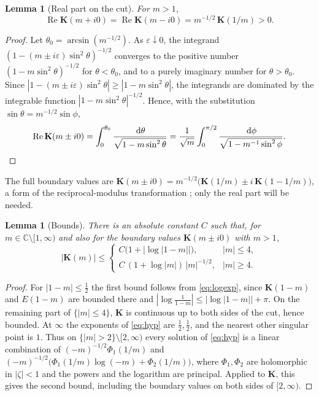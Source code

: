 \documentclass[11pt]{amsart}
\numberwithin{equation}{section}
\newtheorem{lemma}[theorem]{Lemma}
\theoremstyle{definition}
\theoremstyle{remark}
\newcommand{\C}{\mathbb{C}}
\newcommand{\dd}{\,\mathrm{d}}
\DeclareMathOperator{\re}{Re}
\newcommand{\Kc}{\mathbf{K}}
\begin{document}
\begin{lemma}[Real part on the cut]\label{lem:cut}
For $m>1$,
\[
\re\Kc(m+i0)=\re\Kc(m-i0)=m^{-1/2}\,\Kc(1/m)>0 .
\]
\end{lemma}

\begin{proof}
Let $\theta_0=\arcsin(m^{-1/2})$. As $\varepsilon\downarrow0$, the
integrand $(1-(m\pm i\varepsilon)\sin^2\theta)^{-1/2}$ converges to the positive number
$(1-m\sin^2\theta)^{-1/2}$ for $\theta<\theta_0$, and to a purely imaginary
number for $\theta>\theta_0$. Since
$|1-(m\pm i\varepsilon)\sin^2\theta|\ge|1-m\sin^2\theta|$, the integrands are
dominated by the integrable function $|1-m\sin^2\theta|^{-1/2}$. Hence, with
the substitution $\sin\theta=m^{-1/2}\sin\phi$,
\[
\re\Kc(m\pm i0)=\int_0^{\theta_0}\frac{\dd\theta}{\sqrt{1-m\sin^2\theta}}
=\frac{1}{\sqrt m}\int_0^{\pi/2}\frac{\dd\phi}{\sqrt{1-m^{-1}\sin^2\phi}} .
\qedhere
\]
\end{proof}

The full boundary values are $\Kc(m\pm i0)=m^{-1/2}\bigl(\Kc(1/m)\pm
i\,\Kc(1-1/m)\bigr)$, a form of the reciprocal-modulus transformation
\cite[19.7.3]{DLMF}; only the real part will be needed.

\begin{lemma}[Bounds]\label{lem:bounds}
There is an absolute constant $C$ such that, for $m\in\C\setminus[1,\infty)$
and also for the boundary values $\Kc(m\pm i0)$ with $m>1$,
\[
|\Kc(m)|\le
\begin{cases}
C\bigl(1+\bigl|\log|1-m|\bigr|\bigr), & |m|\le4,\\[0.5ex]
C\,(1+\log|m|)\,|m|^{-1/2}, & |m|\ge4.
\end{cases}
\]
\end{lemma}

\begin{proof}
For $|1-m|\le\frac12$ the first bound follows from \eqref{eq:logexp}, since
$\Kc(1-m)$ and $E(1-m)$ are bounded there and
$|\log\frac1{1-m}|\le|\log|1-m||+\pi$. On the remaining part of
$\{|m|\le4\}$, $\Kc$ is continuous up to both sides of the cut, hence bounded.
At $\infty$ the exponents of \eqref{eq:hyp} are $\frac12,\frac12$, and the
nearest other singular point is $1$. Thus on $\{|m|>2\}\setminus[2,\infty)$
every solution of \eqref{eq:hyp} is a linear combination of
$(-m)^{-1/2}\Phi_1(1/m)$ and
$(-m)^{-1/2}\bigl(\Phi_1(1/m)\log(-m)+\Phi_2(1/m)\bigr)$, where $\Phi_1,\Phi_2$
are holomorphic in $|\zeta|<1$ and the powers and the logarithm are principal.
Applied to $\Kc$, this gives the second bound, including the boundary values on
both sides of $[2,\infty)$.
\end{proof}
\end{document}
